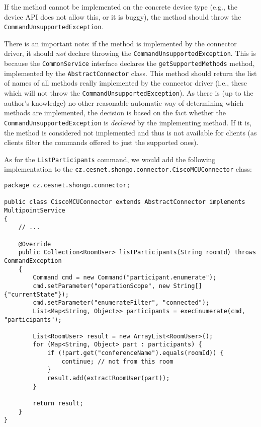 If the method cannot be implemented on the concrete device type (e.g., the device API does not allow this, or it is buggy), the method should throw the \texttt{CommandUnsupportedException}.

There is an important note: if the method is implemented by the connector driver, it should \textit{not} declare throwing the \texttt{CommandUnsupportedException}. This is because the \texttt{CommonService} interface declares the \texttt{getSupportedMethods} method, implemented by the \texttt{AbstractConnector} class. This method should return the list of names of all methods really implemented by the connector driver (i.e., these which will not throw the \texttt{CommandUnsupportedException}). As there is (up to the author's knowledge) no other reasonable automatic way of determining which methods are implemented, the decision is based on the fact whether the \texttt{CommandUnsupportedException} is \textit{declared} by the implementing method. If it is, the method is considered not implemented and thus is not available for clients (as clients filter the commands offered to just the supported ones).

\bigskip

As for the \texttt{ListParticipants} command, we would add the following implementation to the \texttt{cz.cesnet.shongo.connector.CiscoMCUConnector} class:

{ \small
\begin{verbatim}
package cz.cesnet.shongo.connector;

public class CiscoMCUConnector extends AbstractConnector implements MultipointService
{
    // ...

    @Override
    public Collection<RoomUser> listParticipants(String roomId) throws CommandException
    {
        Command cmd = new Command("participant.enumerate");
        cmd.setParameter("operationScope", new String[]{"currentState"});
        cmd.setParameter("enumerateFilter", "connected");
        List<Map<String, Object>> participants = execEnumerate(cmd, "participants");

        List<RoomUser> result = new ArrayList<RoomUser>();
        for (Map<String, Object> part : participants) {
            if (!part.get("conferenceName").equals(roomId)) {
                continue; // not from this room
            }
            result.add(extractRoomUser(part));
        }

        return result;
    }
}
\end{verbatim}
}

